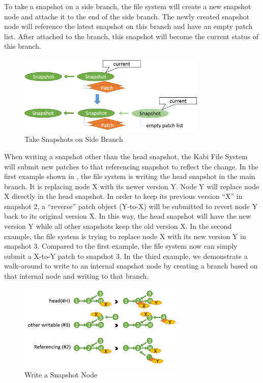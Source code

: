 	To take a snapshot on a side branch, the file system will create a new snapshot node and attache it to the end of the side branch. The newly created snapshot node will reference the latest snapshot on this branch and have an empty patch list. After attached to the branch, this snapshot will become the current status of this branch.

\begin{figure}[t]
\centering
\includegraphics[width=0.8\textwidth]{Chapter-4/figs/fig21.png}
\caption{Take Snapshots on Side Branch}
\label{fig:take_snapshot_nonroot}
\end{figure}
    
    When writing a snapshot other than the head snapshot, the Kabi File System will submit new patches to that referencing snapshot to reflect the change. In the first example shown in , the file system is writing the head snapshot in the main branch. It is replacing node X with its newer version Y. Node Y will replace node X directly in the head snapshot. In order to keep its previous version ``X'' in snapshot 2, a ``reverse'' patch object (Y-to-X) will be submitted to revert node Y back to its original version X. In this way, the head snapshot will have the new version Y while all other snapshots keep the old version X. In the second example, the file system is trying to replace node X with its new version Y in snapshot 3. Compared to the first example, the file system now can simply submit a X-to-Y patch to snapshot 3. In the third example, we demonstrate a walk-around to write to an internal snapshot node by creating a branch based on that internal node and writing to that branch.

\begin{figure}[t]
\centering
\includegraphics[width=0.7\textwidth]{Chapter-4/figs/fig17.png}
\caption{Write a Snapshot Node}
\label{fig:write_snapshot_node}
\end{figure}

